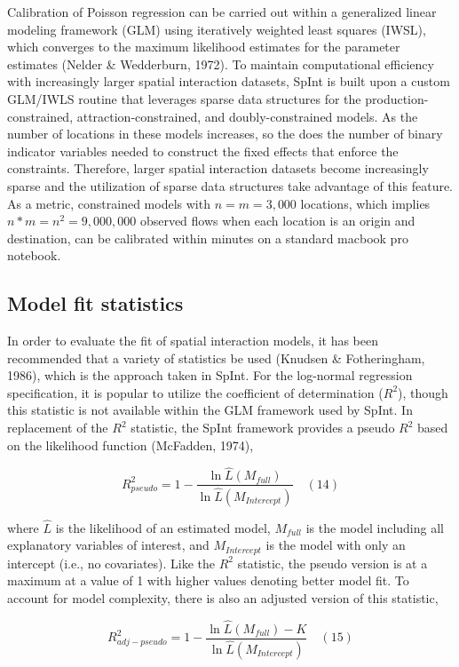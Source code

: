 \documentclass[11pt]{article}
\begin{document}
Calibration of Poisson regression can be carried out within a
generalized linear modeling framework (GLM) using iteratively weighted
least squares (IWSL), which converges to the maximum likelihood
estimates for the parameter estimates (Nelder \& Wedderburn, 1972). To
maintain computational efficiency with increasingly larger spatial
interaction datasets, SpInt is built upon a custom GLM/IWLS routine that
leverages sparse data structures for the production-constrained,
attraction-constrained, and doubly-constrained models. As the number of
locations in these models increases, so the does the number of binary
indicator variables needed to construct the fixed effects that enforce
the constraints. Therefore, larger spatial interaction datasets become
increasingly sparse and the utilization of sparse data structures take
advantage of this feature. As a metric, constrained models with
\(n = m = 3,000\) locations, which implies \(n*m = n^2 = 9,000,000\)
observed flows when each location is an origin and destination, can be
calibrated within minutes on a standard macbook pro notebook.

    \subsection{Model fit statistics}\label{model-fit-statistics}

    In order to evaluate the fit of spatial interaction models, it has been
recommended that a variety of statistics be used (Knudsen \&
Fotheringham, 1986), which is the approach taken in SpInt. For the
log-normal regression specification, it is popular to utilize the
coefficient of determination (\(R^2\)), though this statistic is not
available within the GLM framework used by SpInt. In replacement of the
\(R^2\) statistic, the SpInt framework provides a pseudo \(R^2\) based
on the likelihood function (McFadden, 1974),

\[R^2_{pseudo} = 1 - \frac{\ln \hat{L}(M_{full})}{\ln \hat{L}(M_{Intercept})} \quad(14)\]

where \(\hat{L}\) is the likelihood of an estimated model, \(M_{full}\)
is the model including all explanatory variables of interest, and
\(M_{Intercept}\) is the model with only an intercept (i.e., no
covariates). Like the \(R^2\) statistic, the pseudo version is at a
maximum at a value of 1 with higher values denoting better model fit. To
account for model complexity, there is also an adjusted version of this
statistic,

\[R^2_{adj-pseudo} = 1 - \frac{\ln \hat{L}(M_{full}) - K}{\ln \hat{L}(M_{Intercept})} \quad(15)\]
\end{document}
